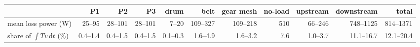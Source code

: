 \begin{tabular}{lrrrrrrrrrr}
\toprule
 & P1 & P2 & P3 & drum & belt & gear mesh & no-load & upstream & downstream & total \\
\midrule
mean loss power (W) & 25--95 & 28--101 & 28--101 & 7--20 & 109--327 & 109--218 & 510 & 66--246 & 748--1125 & 814--1371 \\
share of $\int T v\,\mathrm{d}t$ (\%) & 0.4--1.4 & 0.4--1.5 & 0.4--1.5 & 0.1--0.3 & 1.6--4.9 & 1.6--3.2 & 7.6 & 1.0--3.7 & 11.1--16.7 & 12.1--20.4 \\
\bottomrule
\end{tabular}
